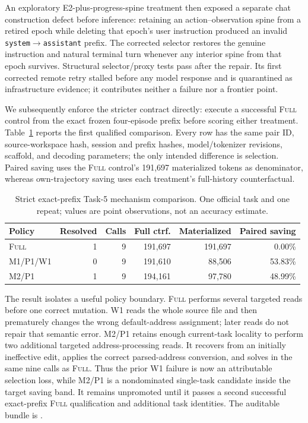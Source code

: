 \documentclass[11pt]{article}
\begin{document}
An exploratory E2-plus-progress-spine treatment then exposed a separate chat
construction defect before inference: retaining an action--observation spine
from a retired epoch while deleting that epoch's user instruction produced an
invalid \texttt{system}$\rightarrow$\texttt{assistant} prefix.  The corrected
selector restores the genuine instruction and natural terminal turn whenever
any interior spine from that epoch survives.  Structural selector/proxy tests
pass after the repair.  Its first corrected remote retry stalled before any
model response and is quarantined as infrastructure evidence; it contributes
neither a failure nor a frontier point.

We subsequently enforce the stricter contract directly: execute a successful
\textsc{Full} control from the exact frozen four-episode prefix before scoring
either treatment.  Table~\ref{tab:task5-strict-prefix} reports the first
qualified comparison.  Every row has the same pair ID, source-workspace hash,
session and prefix hashes, model/tokenizer revisions, scaffold, and decoding
parameters; the only intended difference is selection.  Paired saving uses the
\textsc{Full} control's 191,697 materialized tokens as denominator, whereas
own-trajectory saving uses each treatment's full-history counterfactual.

\begin{table}[H]
\centering
\scriptsize
\caption{Strict exact-prefix Task-5 mechanism comparison.  One official task
and one repeat; values are point observations, not an accuracy estimate.}
\label{tab:task5-strict-prefix}
\begin{tabular}{lrrrrr}
\toprule
Policy & Resolved & Calls & Full ctrf. & Materialized & Paired saving \\
\midrule
\textsc{Full} & 1 & 9 & 191,697 & 191,697 & 0.00\% \\
M1/P1/W1 & 0 & 9 & 191,610 & 88,506 & 53.83\% \\
M2/P1 & 1 & 9 & 194,161 & 97,780 & 48.99\% \\
\bottomrule
\end{tabular}
\end{table}

The result isolates a useful policy boundary.  \textsc{Full} performs several
targeted reads before one correct mutation.  W1 reads the whole source file and
then prematurely changes the wrong default-address assignment; later reads do
not repair that semantic error.  M2/P1 retains enough current-task locality to
perform two additional targeted address-processing reads.  It recovers from an
initially ineffective edit, applies the correct parsed-address conversion, and
solves in the same nine calls as \textsc{Full}.  Thus the prior W1 failure is
now an attributable selection loss, while M2/P1 is a nondominated single-task
candidate inside the target saving band.  It remains unpromoted until it passes
a second successful exact-prefix \textsc{Full} qualification and additional
task identities.  The auditable bundle is
.
\end{document}
